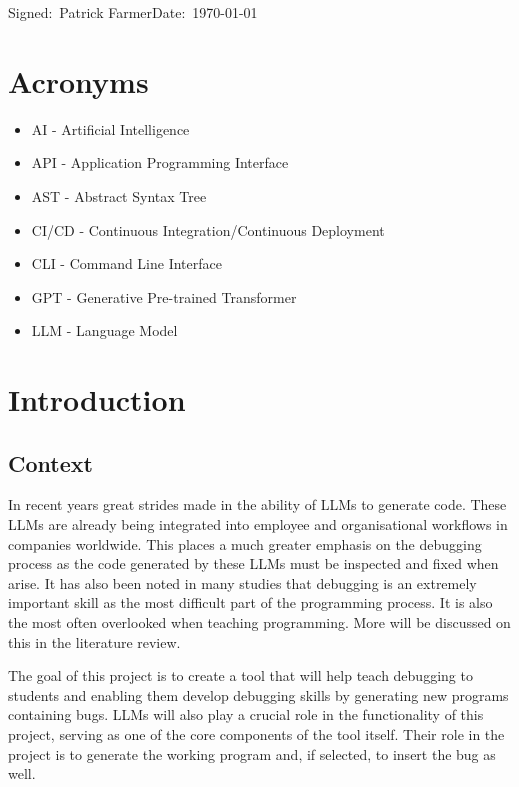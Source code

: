 \documentclass[12pt]{extarticle}
\begin{document}
\small Signed:~Patrick Farmer\hfill Date:~\today

\newpage
\tableofcontents

\newpage
\section*{Acronyms}

\begin{itemize}
    \item AI - Artificial Intelligence
    \item API - Application Programming Interface
    \item AST - Abstract Syntax Tree
    \item CI/CD - Continuous Integration/Continuous Deployment
    \item CLI - Command Line Interface
    \item GPT - Generative Pre-trained Transformer
    \item LLM - Language Model
\end{itemize}
\newpage
\section{Introduction}

\subsection{Context}

In recent years great strides made in the ability of LLMs to generate code. These LLMs are already being integrated into employee and organisational workflows in companies worldwide. This places a much greater emphasis on the debugging process as the code generated by these LLMs must be inspected and fixed when arise. It has also been noted in many studies that debugging is an extremely important skill as the most difficult part of the programming process. It is also the most often overlooked when teaching programming. More will be discussed on this in the literature review. 

The goal of this project is to create a tool that will help teach debugging to students and enabling them develop debugging skills by generating new programs containing bugs. LLMs will also play a crucial role in the functionality of this project, serving as one of the core components of the tool itself. Their role in the project is to generate the working program and, if selected, to insert the bug as well.
\end{document}

